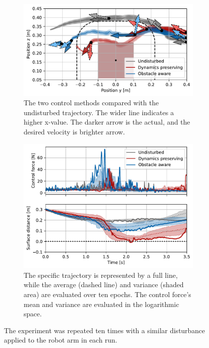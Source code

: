 \begin{figure}[htbp]
    \begin{subfigure}{\columnwidth}
      \centerline{\includegraphics[width=\textwidth]{figures/robot_arm_trajectory_xyz}}
      \caption{The two control methods compared with the undisturbed trajectory. The wider line indicates a higher x-value. The darker arrow is the actual, and the desired velocity is brighter arrow.}
      \label{fig:robot_arm_trajectory_xyz}
    \end{subfigure}
    \begin{subfigure}{\columnwidth}
		\includegraphics[width=\textwidth]{figures/trajectory_comparison_force_and_distance}
      \caption{The specific trajectory is represented by a full line, while the average (dashed line) and variance (shaded area) are evaluated over ten epochs. The control force's mean and variance are evaluated in the logarithmic space.}
      \label{fig:trajectory_comparison_force_and_distance}
    \end{subfigure}
	\caption{
 The experiment was repeated ten times with a similar disturbance applied to the robot arm in each run.
 }  
    \label{fig:evaluation_on_robot_arm}
\end{figure}
